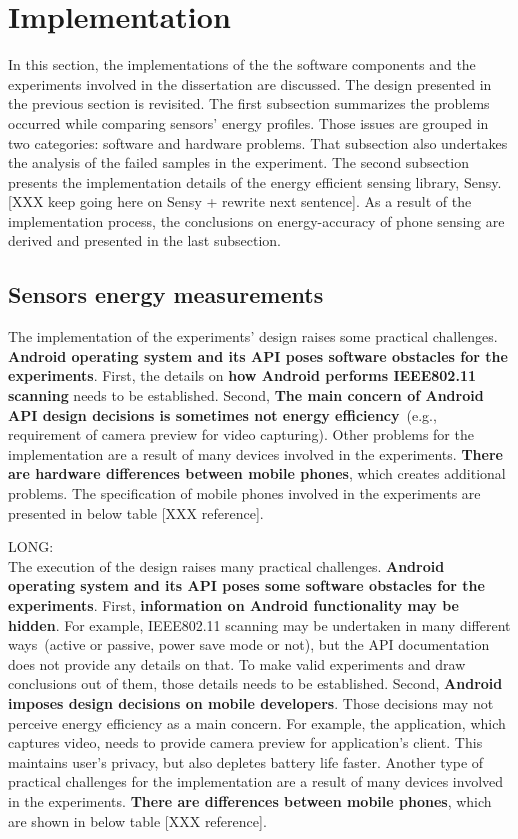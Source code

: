 \section{Implementation}
\label{s:implementation}
\hspace{10pt} In this section, the implementations of the the software components and the experiments involved in the dissertation are discussed. The design presented in the previous section is revisited. The first subsection summarizes the problems occurred while comparing sensors' energy profiles. Those issues are grouped in two categories: software and hardware problems. That subsection also undertakes the analysis of the failed samples in the experiment. The second subsection presents the implementation details of the energy efficient sensing library, Sensy. [XXX keep going here on Sensy + rewrite next sentence]. As a result of the implementation process, the conclusions on energy-accuracy of phone sensing are derived and presented in the last subsection.

\subsection{Sensors energy measurements}
The implementation of the experiments' design raises some practical challenges. \textbf{Android operating system and its API poses software obstacles for the experiments}. First, the details on \textbf{how Android performs IEEE802.11 scanning} needs to be established. Second, \textbf{The main concern of Android API design decisions is sometimes not energy efficiency}\ (e.g., requirement of camera preview for video capturing). Other problems for the implementation are a result of many devices involved in the experiments. \textbf{There are hardware differences between mobile phones},  which creates additional problems. The specification of mobile phones involved in the experiments are presented in below table [XXX reference].

LONG:\\
The execution of the design raises many practical challenges. \textbf{Android operating system and its API poses some software obstacles for the experiments}. First, \textbf{information on Android functionality may be hidden}. For example, IEEE802.11 scanning may be undertaken in many different ways\ (active or passive, power save mode or not), but the API documentation does not provide any details on that. To make valid experiments and draw conclusions out of them, those details needs to be established. Second, \textbf{Android imposes design decisions on mobile developers}. Those decisions may not perceive energy efficiency as a main concern. For example, the application, which captures video, needs to provide camera preview for application's client. This maintains user's privacy, but also depletes battery life faster. Another type of practical challenges for the implementation are a result of many devices involved in the experiments. \textbf{There are differences between mobile phones}, which are shown in below table [XXX reference].
	
